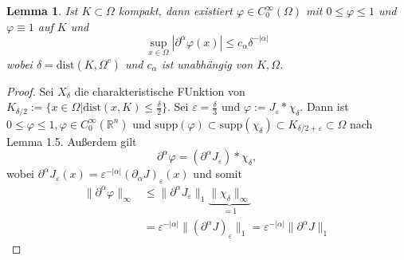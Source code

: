 \documentclass[
paper=a4,
bibtotocnumbered,
liststotocnumbered,
tablecaptionabove,
pointlessnumbers,
twoside,
openright,
10pt
]
{report}
\newcommand{\dist}{\mathrm{dist}}
\let\phi\varphi
\newtheorem{lem}[thm]{Lemma}
\theoremstyle{definition}
\numberwithin{equation}{chapter}
\begin{document}
\begin{lem}
Ist $K\subset \Omega$ kompakt, dann existiert $\phi \in C_0^\infty(\Omega)$ mit $0\le \phi \le 1$ und $\phi \equiv 1$ auf $K$ und
$$
\sup_{x\in \Omega} |\partial^\alpha \phi(x)|\le c_\alpha \delta^{-|\alpha|}
$$ 
wobei $\delta = \dist(K, \Omega^c)$ und $c_\alpha$ ist unabhängig von $K, \Omega$.
\end{lem}
\begin{proof}
Sei $X_\delta$ die charakteristische FUnktion von $K_{\delta/2}:= \{x\in \Omega|\text{dist} (x,K) \le \frac{\delta}{2}\}$. Sei $\varepsilon = \frac{\delta}{3}$ und $\phi:= J_\varepsilon * \chi_\delta$. Dann ist $0 \le \phi \le 1, \phi \in C_0^\infty(\mathbb R^n)$ und $\text{supp}(\phi) \subset \text{supp}(\chi_\delta) \subset K_{\delta/2+ \varepsilon} \subset \Omega$ nach Lemma 1.5. Außerdem gilt
$$
\partial^\alpha \phi = (\partial^\alpha J_\varepsilon) * \chi_\delta,
$$ 
wobei $\partial^\alpha J_\varepsilon(x) = \varepsilon^{-|\alpha|} (\partial_\alpha J)_\varepsilon (x)$ und somit
\begin{align*}
\|\partial^\alpha \phi\|_\infty &\le \| \partial^\alpha J_\varepsilon \|_1 \underbrace{\| \chi_\delta\|_\infty}_{=1} \\
&= \varepsilon^{-|\alpha|} \| (\partial^\alpha J)_\varepsilon\|_1 = \varepsilon^{-|\alpha|} \| \partial^\alpha J\|_1
\end{align*} 
\end{proof}
\end{document}
